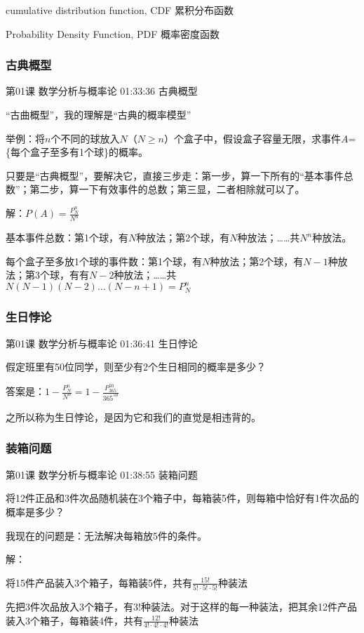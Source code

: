 \documentclass[UTF8]{ctexart}
\begin{document}
cumulative distribution function, CDF 累积分布函数

Probability Density Function, PDF 概率密度函数

\subsubsection{古典概型}

第01课 数学分析与概率论 01:33:36 古典概型

“古曲概型”，我的理解是“古典的概率模型”

举例：将$n$个不同的球放入$N$（$N \geq n$）个盒子中，假设盒子容量无限，求事件$A$=\{每个盒子至多有1个球\}的概率。

只要是“古典概型”，要解决它，直接三步走：第一步，算一下所有的“基本事件总数”；第二步，算一下有效事件的总数；第三显，二者相除就可以了。

解：$P(A)=\frac{P_{N}^{n}}{N^{n}}$

基本事件总数：第1个球，有$N$种放法；第2个球，有$N$种放法；……共$N^{n}$种放法。

每个盒子至多放1个球的事件数：第1个球，有$N$种放法；第2个球，有$N-1$种放法；第3个球，有有$N-2$种放法；……共$N(N-1)(N-2)\dots(N-n+1)=P_{N}^{n}$

\subsubsection{生日悖论}

第01课 数学分析与概率论 01:36:41 生日悖论

假定班里有50位同学，则至少有2个生日相同的概率是多少？

答案是：$1-\frac{P_{N}^{n}}{N^{n}}=1-\frac{P_{365}^{50}}{365^{50}}$

之所以称为生日悖论，是因为它和我们的直觉是相违背的。

\subsubsection{装箱问题}

第01课 数学分析与概率论 01:38:55 装箱问题

将12件正品和3件次品随机装在3个箱子中，每箱装5件，则每箱中恰好有1件次品的概率是多少？

我现在的问题是：无法解决每箱放5件的条件。

解：

将15件产品装入3个箱子，每箱装5件，共有$\frac{15!}{5!\cdot5!\cdot5!}$种装法

先把3件次品放入3个箱子，有$3!$种装法。对于这样的每一种装法，把其余12件产品装入3个箱子，每箱装4件，共有$\frac{12!}{4!\cdot4!\cdot4!}$种装法
\end{document}
